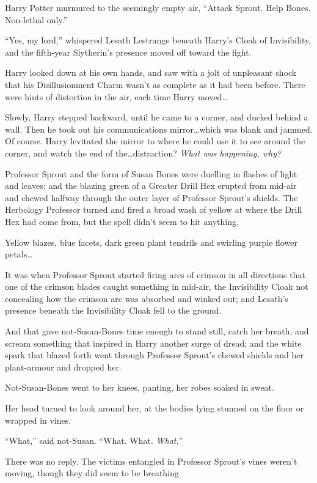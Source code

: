Harry Potter murmured to the seemingly empty air, “Attack Sprout. Help Bones. Non-lethal only.”

“Yes, my lord,” whispered Lesath Lestrange beneath Harry’s Cloak of Invisibility, and the fifth-year Slytherin’s presence moved off toward the fight.

Harry looked down at his own hands, and saw with a jolt of unpleasant shock that his Disillusionment Charm wasn’t as complete as it had been before. There were hints of distortion in the air, each time Harry moved…

Slowly, Harry stepped backward, until he came to a corner, and ducked behind a wall. Then he took out his communications mirror…which was blank and jammed. Of course. Harry levitated the mirror to where he could use it to see around the corner, and watch the end of the…distraction? \emph{What was happening, why?}

Professor Sprout and the form of Susan Bones were duelling in flashes of light and leaves; and the blazing green of a Greater Drill Hex erupted from mid-air and chewed halfway through the outer layer of Professor Sprout’s shields. The Herbology Professor turned and fired a broad wash of yellow at where the Drill Hex had come from, but the spell didn’t seem to hit anything.

Yellow blazes, blue facets, dark green plant tendrils and swirling purple flower petals…

It was when Professor Sprout started firing arcs of crimson in all directions that one of the crimson blades caught something in mid-air, the Invisibility Cloak not concealing how the crimson arc was absorbed and winked out; and Lesath’s presence beneath the Invisibility Cloak fell to the ground.

And that gave not-Susan-Bones time enough to stand still, catch her breath, and scream something that inspired in Harry another surge of dread; and the white spark that blazed forth went through Professor Sprout’s chewed shields and her plant-armour and dropped her.

Not-Susan-Bones went to her knees, panting, her robes soaked in sweat.

Her head turned to look around her, at the bodies lying stunned on the floor or wrapped in vines.

“What,” said not-Susan. “What. What. \emph{What.}”

There was no reply. The victims entangled in Professor Sprout’s vines weren’t moving, though they did seem to be breathing.

